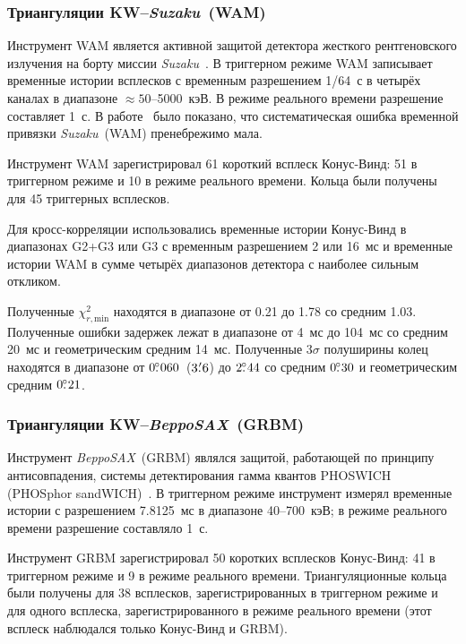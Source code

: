 \subsubsection{Триангуляции KW--\textit{Suzaku}~(WAM)}
Инструмент WAM является активной защитой детектора жесткого рентгеновского 
излучения на борту миссии \textit{Suzaku}~\citep{Yamaoka_2009PASJ}. В триггерном 
режиме WAM записывает временные истории всплесков с временным разрешением 1/64~с 
в четырёх каналах в диапазоне $\approx50$--5000~кэВ. В режиме реального времени 
разрешение составляет 1~с. В работе~\citep{Yamaoka_2009PASJ} было показано, 
что систематическая ошибка временной привязки \textit{Suzaku}~(WAM) пренебрежимо мала.

Инструмент WAM зарегистрировал 61 короткий всплеск Конус-Винд: 51 в триггерном 
режиме и 10 в режиме реального времени. Кольца были получены для 45 триггерных всплесков.

Для кросс-корреляции использовались временные истории Конус-Винд в 
диапазонах G2+G3 или G3 с временным разрешением 2 или 16~мс и временные истории 
WAM в сумме четырёх диапазонов детектора с наиболее сильным откликом.

Полученные $\chi^2_{r,\textrm{min}}$ находятся в диапазоне от 0.21 до 1.78 со средним 1.03. 
Полученные ошибки задержек лежат в диапазоне от 4~мс до 104~мс со средним 20~мс 
и геометрическим средним 14~мс. Полученные $3\sigma$ полуширины колец находятся 
в диапазоне от $0\mbox{$.\!\!^\circ$}060$~($3\mbox{$.\mkern-4mu^\prime$}6$) до $2\mbox{$.\!\!^\circ$}44$ 
со средним $0\mbox{$.\!\!^\circ$}30$ и геометрическим средним $0\mbox{$.\!\!^\circ$}21$.

\subsubsection{Триангуляции KW--\textit{BeppoSAX}~(GRBM)}
Инструмент \textit{BeppoSAX}~(GRBM) являлся защитой, работающей по принципу 
антисовпадения, системы детектирования гамма квантов PHOSWICH 
(PHOSphor sandWICH)~\citep{Feroci_1997SPIE, Frontera_1997AAS}. В триггерном режиме 
инструмент измерял временные истории с разрешением 7.8125~мс в диапазоне 40--700~кэВ; 
в режиме реального времени разрешение составляло 1~с.

Инструмент GRBM зарегистрировал 50 коротких всплесков Конус-Винд: 41 в триггерном 
режиме и 9 в режиме реального времени. Триангуляционные кольца были получены для 38 всплесков,
зарегистрированных в триггерном режиме и для одного всплеска, зарегистрированного 
в режиме реального времени (этот всплеск наблюдался только Конус-Винд и GRBM).

